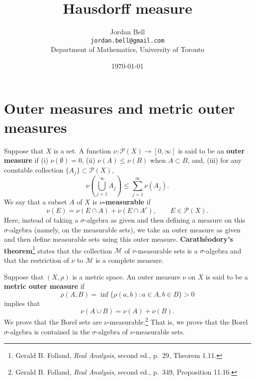 \documentclass{article}
\theoremstyle{definition}
\begin{document}
\title{Hausdorff measure}
\author{Jordan Bell\\ \texttt{jordan.bell@gmail.com}\\Department of Mathematics, University of Toronto}
\date{\today}

\maketitle

\section{Outer measures and metric outer measures}
Suppose that $X$ is a set. A function $\nu:\mathscr{P}(X) \to [0,\infty]$ is said to be an \textbf{outer measure} if (i) $\nu(\emptyset)=0$, 
(ii) $\nu(A) \leq \nu(B)$ when
$A \subset B$, and, (iii) for any countable collection $\{A_j\} \subset \mathscr{P}(X)$,
\[
\nu\left(\bigcup_{j=1}^\infty A_j \right) \leq \sum_{j=1}^\infty \nu(A_j).
\]
We say that a subset $A$ of $X$ is \textbf{$\nu$-measurable} if 
\begin{equation}
\nu(E) = \nu(E \cap A)+ \nu(E \cap A^c), \qquad E \in \mathscr{P}(X).
\label{numeasurable}
\end{equation}
Here, instead of taking a $\sigma$-algebra as given and then defining a measure on this $\sigma$-algebra (namely, on the measurable sets), we take an outer
measure as given and then define measurable sets using this outer measure. \textbf{Carath\'eodory's theorem}\footnote{Gerald
B. Folland, {\em Real Analysis}, second ed., p.~29, Theorem 1.11.} states that the collection $\mathscr{M}$ of $\nu$-measurable sets is a
$\sigma$-algebra and that the restriction of $\nu$ to $\mathscr{M}$ is a complete measure. 

Suppose that $(X,\rho)$ is a metric space.  An outer measure $\nu$ on $X$ is said to be a \textbf{metric outer measure} if
\[
\rho(A,B)=\inf\{\rho(a,b):a \in A, b \in B\}>0
\]
 implies that 
\[
\nu(A \cup B) = \nu(A) + \nu(B).
\]
We prove
that the Borel sets are $\nu$-measurable.\footnote{Gerald B. Folland, {\em Real Analysis}, second ed., p.~349, Proposition 11.16.}
That is, we prove that the Borel $\sigma$-algebra is contained in the $\sigma$-algebra of $\nu$-measurable
sets.
\end{document}
